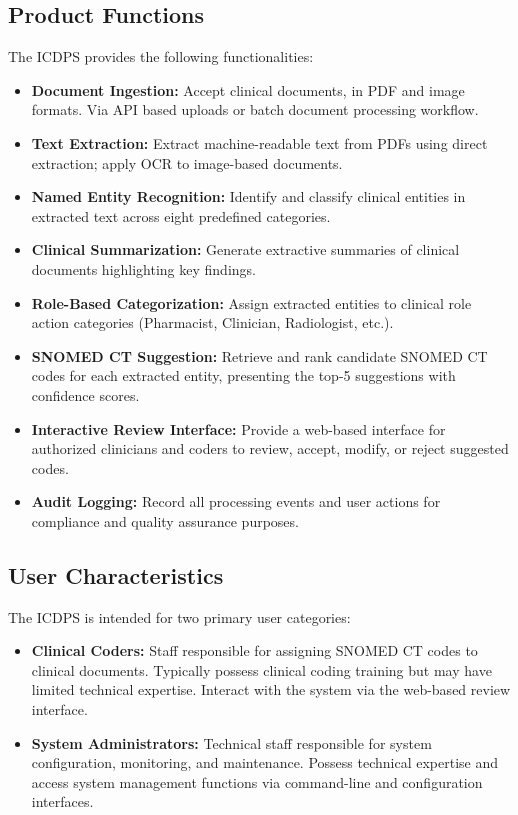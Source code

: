 \subsection{Product Functions}
The ICDPS provides the following functionalities:
\begin{itemize}
    \item \textbf{Document Ingestion:} Accept clinical documents, in PDF and image formats. Via API based uploads or batch document processing workflow.
    \item \textbf{Text Extraction:} Extract machine-readable text from PDFs using direct extraction; apply OCR to image-based documents.
    \item \textbf{Named Entity Recognition:} Identify and classify clinical entities in extracted text across eight predefined categories.
    \item \textbf{Clinical Summarization:} Generate extractive summaries of clinical documents highlighting key findings.
    \item \textbf{Role-Based Categorization:} Assign extracted entities to clinical role action categories (Pharmacist, Clinician, Radiologist, etc.).
    \item \textbf{SNOMED CT Suggestion:} Retrieve and rank candidate SNOMED CT codes for each extracted entity, presenting the top-5 suggestions with confidence scores.
    \item \textbf{Interactive Review Interface:} Provide a web-based interface for authorized clinicians and coders to review, accept, modify, or reject suggested codes.
    \item \textbf{Audit Logging:} Record all processing events and user actions for compliance and quality assurance purposes.
\end{itemize}

\subsection{User Characteristics}
The ICDPS is intended for two primary user categories:
\begin{itemize}
    \item \textbf{Clinical Coders:} Staff responsible for assigning SNOMED CT codes to clinical documents. Typically possess clinical coding training but may have limited technical expertise. Interact with the system via the web-based review interface.
    \item \textbf{System Administrators:} Technical staff responsible for system configuration, monitoring, and maintenance. Possess technical expertise and access system management functions via command-line and configuration interfaces.
\end{itemize}

